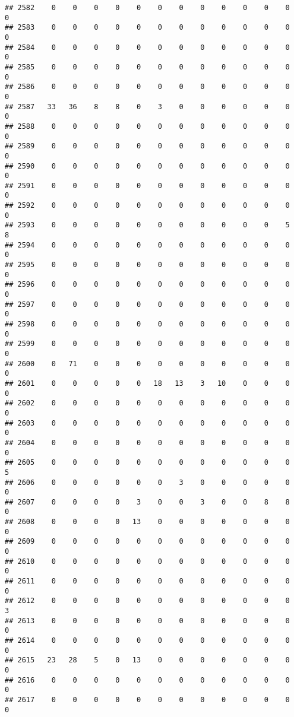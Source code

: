 \documentclass[]{article}
\begin{document}
\begin{verbatim}
## 2582    0    0    0    0    0    0    0    0    0    0    0    0    0
## 2583    0    0    0    0    0    0    0    0    0    0    0    0    0
## 2584    0    0    0    0    0    0    0    0    0    0    0    0    0
## 2585    0    0    0    0    0    0    0    0    0    0    0    0    0
## 2586    0    0    0    0    0    0    0    0    0    0    0    0    0
## 2587   33   36    8    8    0    3    0    0    0    0    0    0    0
## 2588    0    0    0    0    0    0    0    0    0    0    0    0    0
## 2589    0    0    0    0    0    0    0    0    0    0    0    0    0
## 2590    0    0    0    0    0    0    0    0    0    0    0    0    0
## 2591    0    0    0    0    0    0    0    0    0    0    0    0    0
## 2592    0    0    0    0    0    0    0    0    0    0    0    0    0
## 2593    0    0    0    0    0    0    0    0    0    0    0    5    8
## 2594    0    0    0    0    0    0    0    0    0    0    0    0    0
## 2595    0    0    0    0    0    0    0    0    0    0    0    0    0
## 2596    0    0    0    0    0    0    0    0    0    0    0    0    0
## 2597    0    0    0    0    0    0    0    0    0    0    0    0    0
## 2598    0    0    0    0    0    0    0    0    0    0    0    0    0
## 2599    0    0    0    0    0    0    0    0    0    0    0    0    0
## 2600    0   71    0    0    0    0    0    0    0    0    0    0    0
## 2601    0    0    0    0    0   18   13    3   10    0    0    0    0
## 2602    0    0    0    0    0    0    0    0    0    0    0    0    0
## 2603    0    0    0    0    0    0    0    0    0    0    0    0    0
## 2604    0    0    0    0    0    0    0    0    0    0    0    0    0
## 2605    0    0    0    0    0    0    0    0    0    0    0    0    5
## 2606    0    0    0    0    0    0    3    0    0    0    0    0    0
## 2607    0    0    0    0    3    0    0    3    0    0    8    8    0
## 2608    0    0    0    0   13    0    0    0    0    0    0    0    0
## 2609    0    0    0    0    0    0    0    0    0    0    0    0    0
## 2610    0    0    0    0    0    0    0    0    0    0    0    0    0
## 2611    0    0    0    0    0    0    0    0    0    0    0    0    0
## 2612    0    0    0    0    0    0    0    0    0    0    0    0    3
## 2613    0    0    0    0    0    0    0    0    0    0    0    0    0
## 2614    0    0    0    0    0    0    0    0    0    0    0    0    0
## 2615   23   28    5    0   13    0    0    0    0    0    0    0    0
## 2616    0    0    0    0    0    0    0    0    0    0    0    0    0
## 2617    0    0    0    0    0    0    0    0    0    0    0    0    0

\end{verbatim}
\end{document}
